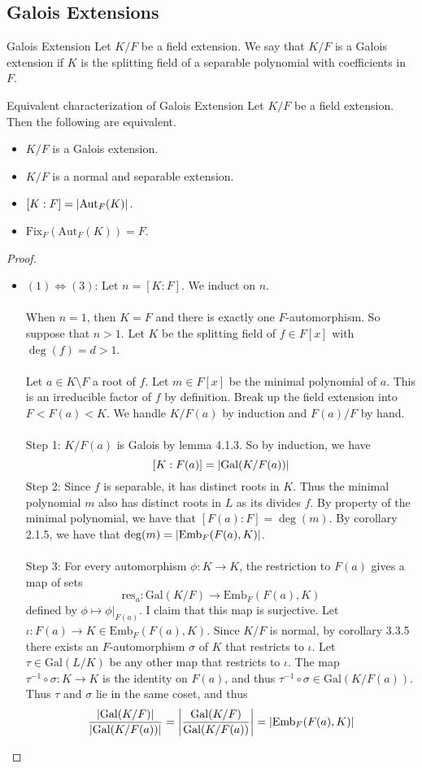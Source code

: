 \documentclass[a4paper]{article}
\begin{document}
\subsection{Galois Extensions}
\begin{defn}{Galois Extension}{} Let $K/F$ be a field extension. We say that $K/F$ is a Galois extension if $K$ is the splitting field of a separable polynomial with coefficients in $F$. 
\end{defn}

\begin{prp}{Equivalent characterization of Galois Extension}{} Let $K/F$ be a field extension. Then the following are equivalent. 
\begin{itemize}
\item $K/F$ is a Galois extension. 
\item $K/F$ is a normal and separable extension. 
\item $[K:F]=\abs{\text{Aut}_F(K)}$. 
\item $\text{Fix}_F(\text{Aut}_F(K))=F$. 
\end{itemize} \tcbline
\begin{proof}~\\
\begin{itemize}
\item $(1)\iff(3)$: Let $n=[K:F]$. We induct on $n$. \\~\\
When $n=1$, then $K=F$ and there is exactly one $F$-automorphism. So suppose that $n>1$. Let $K$ be the splitting field of $f\in F[x]$ with $\deg(f)=d>1$. \\~\\
Let $a\in K\setminus F$ a root of $f$. Let $m\in F[x]$ be the minimal polynomial of $a$. This is an irreducible factor of $f$ by definition. Break up the field extension into $F<F(a)<K$. We handle $K/F(a)$ by induction and $F(a)/F$ by hand. \\~\\
Step 1: $K/F(a)$ is Galois by lemma 4.1.3. So by induction, we have $$[K:F(a)]=\abs{\text{Gal}(K/F(a))}$$
Step 2: Since $f$ is separable, it has distinct roots in $K$. Thus the minimal polynomial $m$ also has distinct roots in $L$ as its divides $f$. By property of the minimal polynomial, we have that $[F(a):F]=\deg(m)$. By corollary 2.1.5, we have that $\deg(m)=\abs{\text{Emb}_F(F(a),K)}$. \\~\\
Step 3: For every automorphism $\phi:K\to K$, the restriction to $F(a)$ gives a map of sets $$\text{res}_a:\text{Gal}(K/F)\to\text{Emb}_F(F(a),K)$$ defined by $\phi\mapsto\phi|_{F(a)}$. I claim that this map is surjective. Let $\iota:F(a)\to K\in\text{Emb}_F(F(a),K)$. Since $K/F$ is normal, by corollary 3.3.5 there exists an $F$-automorphism $\sigma$ of $K$ that restricts to $\iota$. Let $\tau\in\text{Gal}(L/K)$ be any other map that restricts to $\iota$. The map $\tau^{-1}\circ\sigma:K\to K$ is the identity on $F(a)$, and thus $\tau^{-1}\circ\sigma\in\text{Gal}(K/F(a))$. Thus $\tau$ and $\sigma$ lie in the same coset, and thus $$\frac{\abs{\text{Gal}(K/F)}}{\abs{\text{Gal}(K/F(a))}}=\abs{\frac{\text{Gal}(K/F)}{\text{Gal}(K/F(a))}}=\abs{\text{Emb}_F(F(a),K)}$$

\end{itemize}
\end{proof}
\end{prp}
\end{document}
